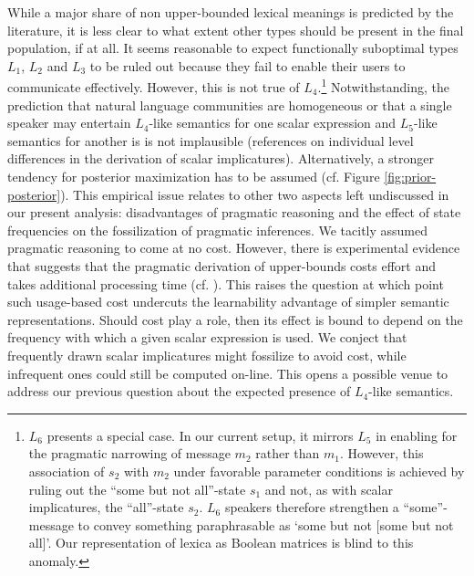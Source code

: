 \documentclass[a4paper]{article}
\newcommand{\hl}[1]{\textcolor[rgb]{.8,.33,.0}{#1}}%
\begin{document}
While a major share of non upper-bounded lexical meanings is predicted by the literature, it is less clear to what extent other types should be present in the final population, if at all. It seems reasonable to expect functionally suboptimal types $L_1$, $L_2$ and $L_3$ to be ruled out because they fail to enable their users to communicate effectively. However, this is not true of $L_4$.\footnote{$L_6$ presents a special case. In our current setup, it mirrors $L_5$ in enabling for the pragmatic narrowing of message $m_2$ rather than $m_1$. However, this association of $s_2$ with $m_2$ under favorable parameter conditions is achieved by ruling out the ``some but not all''-state $s_1$ and not, as with scalar implicatures, the ``all''-state $s_2$. $L_6$ speakers therefore strengthen a ``some''-message to convey something paraphrasable as `some but not [some but not all]'. Our representation of lexica as Boolean matrices is blind to this anomaly.} Notwithstanding, the prediction that natural language communities are homogeneous or that a single speaker may entertain $L_4$-like semantics for one scalar expression and $L_5$-like semantics for another is is not implausible (\hl{references on individual level differences in the derivation of scalar implicatures}). Alternatively, a stronger tendency for posterior maximization has to be assumed (cf. Figure \ref{fig:prior-posterior}). This empirical issue relates to other two aspects left undiscussed in our present analysis: disadvantages of pragmatic reasoning and the effect of state frequencies on the fossilization of pragmatic inferences. We tacitly assumed pragmatic reasoning to come at no cost. However, there is experimental evidence that suggests  that the pragmatic derivation of upper-bounds costs effort and takes additional processing time (cf. \citealt{deNeys+schaeken:2007, huang+snedeker:2009}). This raises the question at which point such usage-based cost undercuts the learnability advantage of simpler semantic representations. Should cost play a role, then its effect is bound to depend on the frequency with which a given scalar expression is used. We conject that frequently drawn scalar implicatures might fossilize to avoid cost, while infrequent ones could still be computed on-line. This opens a possible venue to address our previous question about the expected presence of $L_4$-like semantics. 
\end{document}

